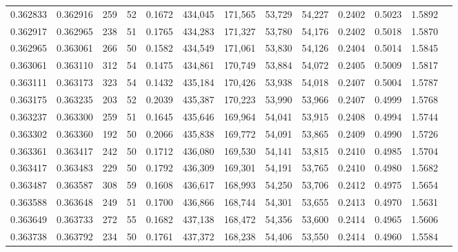 \begin{tabular}{rrrrrrrrrrrrr}
0.362833 & 0.362916 &   259 &  52 &                                     0.1672 & 434,045 & 171,565 &  53,729 &  54,227 & 0.2402 & 0.5023 & 1.5892 \\
0.362917 & 0.362965 &   238 &  51 &                                     0.1765 & 434,283 & 171,327 &  53,780 &  54,176 & 0.2402 & 0.5018 & 1.5870 \\
0.362965 & 0.363061 &   266 &  50 &                                     0.1582 & 434,549 & 171,061 &  53,830 &  54,126 & 0.2404 & 0.5014 & 1.5845 \\
0.363061 & 0.363110 &   312 &  54 &                                     0.1475 & 434,861 & 170,749 &  53,884 &  54,072 & 0.2405 & 0.5009 & 1.5817 \\
0.363111 & 0.363173 &   323 &  54 &                                     0.1432 & 435,184 & 170,426 &  53,938 &  54,018 & 0.2407 & 0.5004 & 1.5787 \\
0.363175 & 0.363235 &   203 &  52 &                                     0.2039 & 435,387 & 170,223 &  53,990 &  53,966 & 0.2407 & 0.4999 & 1.5768 \\
0.363237 & 0.363300 &   259 &  51 &                                     0.1645 & 435,646 & 169,964 &  54,041 &  53,915 & 0.2408 & 0.4994 & 1.5744 \\
0.363302 & 0.363360 &   192 &  50 &                                     0.2066 & 435,838 & 169,772 &  54,091 &  53,865 & 0.2409 & 0.4990 & 1.5726 \\
0.363361 & 0.363417 &   242 &  50 &                                     0.1712 & 436,080 & 169,530 &  54,141 &  53,815 & 0.2410 & 0.4985 & 1.5704 \\
0.363417 & 0.363483 &   229 &  50 &                                     0.1792 & 436,309 & 169,301 &  54,191 &  53,765 & 0.2410 & 0.4980 & 1.5682 \\
0.363487 & 0.363587 &   308 &  59 &                                     0.1608 & 436,617 & 168,993 &  54,250 &  53,706 & 0.2412 & 0.4975 & 1.5654 \\
0.363588 & 0.363648 &   249 &  51 &                                     0.1700 & 436,866 & 168,744 &  54,301 &  53,655 & 0.2413 & 0.4970 & 1.5631 \\
0.363649 & 0.363733 &   272 &  55 &                                     0.1682 & 437,138 & 168,472 &  54,356 &  53,600 & 0.2414 & 0.4965 & 1.5606 \\
0.363738 & 0.363792 &   234 &  50 &                                     0.1761 & 437,372 & 168,238 &  54,406 &  53,550 & 0.2414 & 0.4960 & 1.5584 \\

\end{tabular}
